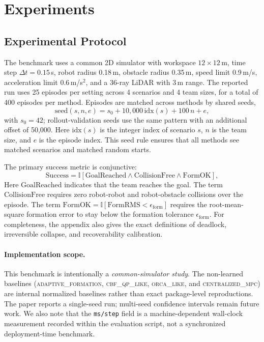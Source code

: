 \documentclass{ieeeaccess}
\begin{document}
\section{Experiments}
\label{sec:experiments}

\subsection{Experimental Protocol}
The benchmark uses a common 2D simulator with workspace
$12\times12$\,m, time step $\Delta t = 0.15$\,s, robot radius 0.18\,m,
obstacle radius 0.35\,m, speed limit 0.9\,m/s, acceleration limit
0.6\,m/s$^2$, and a 36-ray LiDAR with 3\,m range. The reported run uses
25 episodes per setting across 4 scenarios and 4 team sizes, for a
total of 400 episodes per method. Episodes are matched across methods
by shared seeds,
\begin{equation}
\mathrm{seed}(s,n,e)=s_0 + 10{,}000\,\mathrm{idx}(s) + 100\,n + e,
\label{eq:eval_seed}
\end{equation}
with $s_0=42$; rollout-validation seeds use the same pattern with an
additional offset of 50{,}000. Here $\mathrm{idx}(s)$ is the integer
index of scenario $s$, $n$ is the team size, and $e$ is the episode
index. This seed rule ensures that all methods see matched scenarios
and matched random starts.

The primary success metric is conjunctive:
\begin{equation}
\mathrm{Success}
= \mathbb{I}[\mathrm{GoalReached}\wedge \mathrm{CollisionFree}\wedge \mathrm{FormOK}],
\label{eq:success_metric}
\end{equation}
Here $\mathrm{GoalReached}$ indicates that the team reaches the goal.
The term $\mathrm{CollisionFree}$ requires zero robot-robot and
robot-obstacle collisions over the episode. The term
$\mathrm{FormOK}=\mathbb{I}[\mathrm{FormRMS}<\epsilon_{\mathrm{form}}]$
requires the root-mean-square formation error to stay below the
formation tolerance $\epsilon_{\mathrm{form}}$. For completeness, the
appendix also gives the exact definitions of deadlock, irreversible
collapse, and recoverability calibration.

\paragraph{Implementation scope.}
This benchmark is intentionally a \emph{common-simulator study}. The non-learned baselines (\textsc{adaptive\_formation}, \textsc{cbf\_qp\_like}, \textsc{orca\_like}, and \textsc{centralized\_mpc}) are internal normalized baselines rather than exact package-level reproductions. The paper reports a single-seed run; multi-seed confidence intervals remain future work. We also note that the \texttt{ms/step} field is a machine-dependent wall-clock measurement recorded within the evaluation script, not a synchronized deployment-time benchmark.
\end{document}

